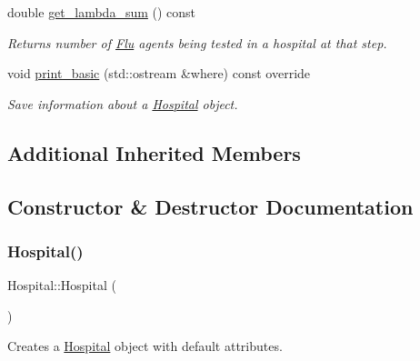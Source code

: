 \begin{DoxyCompactItemize}
double \hyperlink{classHospital_a640cbef59ed726254579948f399d0e8e}{get\+\_\+lambda\+\_\+sum} () const
\begin{DoxyCompactList}\small\item\em Returns number of \hyperlink{classFlu}{Flu} agents being tested in a hospital at that step. \end{DoxyCompactList}\item 
void \hyperlink{classHospital_a3a1963886a9974663c2a3e82817f1a2b}{print\+\_\+basic} (std\+::ostream \&where) const override
\begin{DoxyCompactList}\small\item\em Save information about a \hyperlink{classHospital}{Hospital} object. \end{DoxyCompactList}\end{DoxyCompactItemize}
\subsection*{Additional Inherited Members}


\subsection{Constructor \& Destructor Documentation}
\mbox{\label{classHospital_ae76395fdb36d01f526cb962a13784fbd}} 
\subsubsection{\texorpdfstring{Hospital()}{Hospital()}\hspace{0.1cm}{\footnotesize\ttfamily [1/2]}}
{\footnotesize\ttfamily Hospital\+::\+Hospital (\begin{DoxyParamCaption}{ }\end{DoxyParamCaption})\hspace{0.3cm}{\ttfamily [default]}}



Creates a \hyperlink{classHospital}{Hospital} object with default attributes. 

\mbox{\label{classHospital_a9f0f34e37e3877d717e10e7e41af21f7}} 

